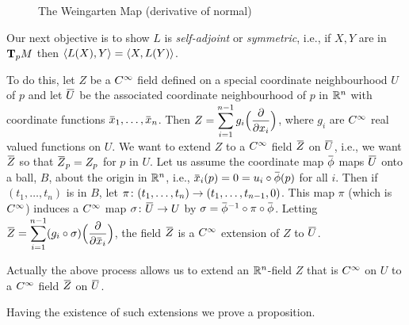 \documentclass[../main]{subfiles}
\begin{document}
\begin{figure}[ht]
    \centering
    \caption{The Weingarten Map (derivative of normal)}
    \label{fig:the-weingarten-map-(derivative-of-normal)}
\end{figure}

Our next objective is to show $L$ is \emph{self-adjoint} or \emph{symmetric}, i.e., if $X,Y$ are in $\tangentspace{M}{p}$ then $\ip{L(X)}{Y}=\ip{X}{L(Y)}$.

To do this, let $Z$ be a $\CInfty$ field defined on a special coordinate neighbourhood $U$ of $p$ and let $\xoverline{U}$ be the associated coordinate neighbourhood of $p$ in $\bR^n$ with coordinate functions $\xoverline{x}_1,\dots,\xoverline{x}_n$. Then $Z=\displaystyle \sum_{i=1}^{n-1}g_i\Big(\pdv{}{ x_i}\Big)$, where $g_i$ are $\CInfty$ real valued functions on $U$. We want to extend $Z$ to a $\CInfty$ field $\xoverline{Z}$ on $\xoverline{U}$, i.e., we want $\xoverline{Z}$ so that $\xoverline{Z}_p=Z_p$ for $p$ in $U$. Let us assume the coordinate map $\xoverline{\phi}$ maps $\xoverline{U}$ onto a ball, $B$, about the origin in $\bR^n$, i.e., $\xoverline{x}_i(p)=0=u_i\circ\xoverline{\phi}(p)$ for all $i$. Then if $(t_1,\dots,t_n)$ is in $B$, let $\pi\colon (t_1,\dots,t_n)\functionMaps(t_1,\dots,t_{n-1},0)$. This map $\pi$ (which is $\CInfty$) induces a $\CInfty$ map $\sigma\colon\xoverline{U}\functionMaps U$ by $\sigma=\xoverline{\phi}^{-1}\circ\pi\circ\xoverline{\phi}$. Letting $\xoverline{Z}=\displaystyle\sum_{i=1}^{n-1}(g_i\circ\sigma)\Big(\pdv{}{\xoverline{x}_i}\Big)$, the field $\xoverline{Z}$ is a $\CInfty$ extension of $Z$ to $\xoverline{U}$.

Actually the above process allows us to extend an $\bR^n$-field $Z$ that is $\CInfty$ on $U$ to a $\CInfty$ field $\xoverline{Z}$ on $\xoverline{U}$.

Having the existence of such extensions we prove a proposition.
\end{document}
